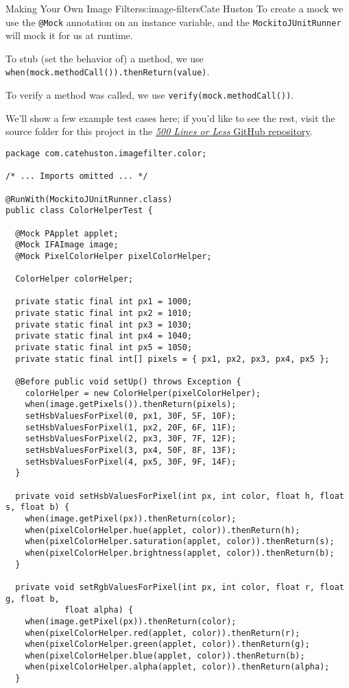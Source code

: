 \begin{aosachapter}{Making Your Own Image Filters}{s:image-filters}{Cate Huston}
To create a mock we use the \texttt{@Mock} annotation on an instance
variable, and the \texttt{MockitoJUnitRunner} will mock it for us at
runtime.

To stub (set the behavior of) a method, we use
\texttt{when(mock.methodCall()).thenReturn(value)}.

To verify a method was called, we use
\texttt{verify(mock.methodCall())}.

We'll show a few example test cases here; if you'd like to see the rest,
visit the source folder for this project in the
\href{https://github.com/aosabook/500lines/tree/master/image-filters}{\emph{500
Lines or Less} GitHub repository}.

\begin{verbatim}
package com.catehuston.imagefilter.color;

/* ... Imports omitted ... */

@RunWith(MockitoJUnitRunner.class)
public class ColorHelperTest {

  @Mock PApplet applet;
  @Mock IFAImage image;
  @Mock PixelColorHelper pixelColorHelper;

  ColorHelper colorHelper;

  private static final int px1 = 1000;
  private static final int px2 = 1010;
  private static final int px3 = 1030;
  private static final int px4 = 1040;
  private static final int px5 = 1050;
  private static final int[] pixels = { px1, px2, px3, px4, px5 };

  @Before public void setUp() throws Exception {
    colorHelper = new ColorHelper(pixelColorHelper);
    when(image.getPixels()).thenReturn(pixels);
    setHsbValuesForPixel(0, px1, 30F, 5F, 10F);
    setHsbValuesForPixel(1, px2, 20F, 6F, 11F);
    setHsbValuesForPixel(2, px3, 30F, 7F, 12F);
    setHsbValuesForPixel(3, px4, 50F, 8F, 13F);
    setHsbValuesForPixel(4, px5, 30F, 9F, 14F);
  }

  private void setHsbValuesForPixel(int px, int color, float h, float s, float b) {
    when(image.getPixel(px)).thenReturn(color);
    when(pixelColorHelper.hue(applet, color)).thenReturn(h);
    when(pixelColorHelper.saturation(applet, color)).thenReturn(s);
    when(pixelColorHelper.brightness(applet, color)).thenReturn(b);
  }

  private void setRgbValuesForPixel(int px, int color, float r, float g, float b, 
            float alpha) {
    when(image.getPixel(px)).thenReturn(color);
    when(pixelColorHelper.red(applet, color)).thenReturn(r);
    when(pixelColorHelper.green(applet, color)).thenReturn(g);
    when(pixelColorHelper.blue(applet, color)).thenReturn(b);
    when(pixelColorHelper.alpha(applet, color)).thenReturn(alpha);
  }


\end{verbatim}
\end{aosachapter}
